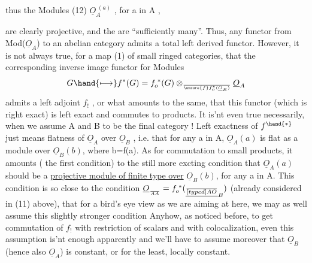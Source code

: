 
thus the Modules
(12) \qquad $\underline{O}_A^{\;(a)}$ \quad , for a in A \quad ,

are clearly projective, and the are ``sufficiently many''. Thus,
any  functor from Mod($\underline{O}_A$) to an abelian category admits a total left
derived functor. However, it is not always true, for a map (1)
of small ringed categories, that the corresponding inverse image
functor for Modules
\[ G \hand{\longmapsto} f^{*}(G)= f_o^{\;*}(G) \otimes_{\over{\unsure{f}}{f}_o^{*}(\underline{O}_B)} \underline{O}_A \]
admits  a left adjoint $f_{!}$ , or what amounts to the same, that
this functor (which is right exact) is left exact and commutes to
  products. It is'nt even true necessarily, when we assume
A and B to be the final category ! Left exactness of $f^{\hand{*}}$ just means
flatness of $\underline{O}_A$ over $\underline{O}_B$ , i.e. that for any a in A, $\underline{O}_A(a)$ is flat as
a module over $\underline{O}_B(b)$, where b=f(a). As for commutation to small
products, it amounts (  the first condition) to the
still more excting condition that $\underline{O}_A(a)$ should be a \uline{projective module
of finite type over} $\underline{O}_B(b)$, for any a in A. This condition is so close
to the condition $\underline{O}_{\over{A}{A}} = f_o^{\;*}(\underline{\over[typed]{A}{O}}_B)$ \quad (already considered in (11) above),
that for a bird's eye view as we are aiming at here, we may as well
assume this slightly stronger condition\hand{!} Anyhow, as noticed before,
to get  commutation of $f_{!}$ with restriction of scalars
and with colocalization, even this assumption is'nt enough apparently\hand{,}
and we'll have to assume moreover that $\underline{O}_B$ (hence also $\underline{O}_A$) is constant,
or for the least, locally constant.


